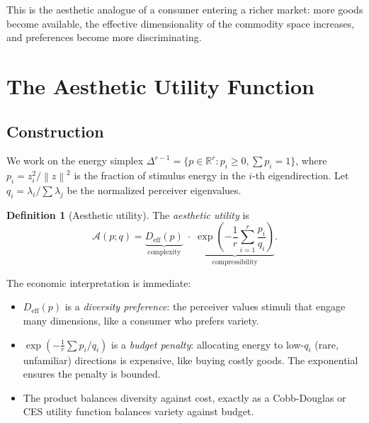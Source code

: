 \documentclass[journal]{IEEEtran}
\theoremstyle{definition}
\newtheorem{definition}[theorem]{Definition}
\theoremstyle{remark}
\newcommand{\R}{\mathbb{R}}
\newcommand{\norm}[1]{\left\lVert #1 \right\rVert}
\begin{document}
This is the aesthetic analogue of a consumer entering a richer
market: more goods become available, the effective dimensionality
of the commodity space increases, and preferences become more
discriminating.


\section{The Aesthetic Utility Function}
\label{sec:utility}

\subsection{Construction}

We work on the energy simplex $\Delta^{r-1} = \{p \in \R^r :
p_i \geq 0, \sum p_i = 1\}$, where $p_i = z_i^2/\norm{z}^2$ is
the fraction of stimulus energy in the $i$-th eigendirection.  Let
$q_i = \lambda_i / \sum \lambda_j$ be the normalized perceiver
eigenvalues.

\begin{definition}[Aesthetic utility]
\label{def:utility}
The \emph{aesthetic utility} is
\begin{equation}
    \mathcal{A}(p; q) =
    \underbrace{D_{\mathrm{eff}}(p)}_{\text{complexity}}
    \;\cdot\;
    \underbrace{\exp\!\left(-\frac{1}{r}\sum_{i=1}^r
    \frac{p_i}{q_i}\right)}_{\text{compressibility}}.
    \label{eq:utility}
\end{equation}
\end{definition}

The economic interpretation is immediate:
\begin{itemize}
    \item $D_{\mathrm{eff}}(p)$ is a \emph{diversity preference}:
    the perceiver values stimuli that engage many dimensions, like
    a consumer who prefers variety.
    \item $\exp(-\frac{1}{r}\sum p_i/q_i)$ is a \emph{budget
    penalty}: allocating energy to low-$q_i$ (rare, unfamiliar)
    directions is expensive, like buying costly goods.  The
    exponential ensures the penalty is bounded.
    \item The product balances diversity against cost, exactly as
    a Cobb-Douglas or CES utility function balances variety against
    budget.
\end{itemize}
\end{document}
